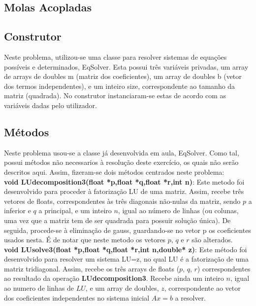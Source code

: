 \documentclass{article}
\begin{document}
\begin{multicols}{2}
  \section{Molas Acopladas}
  \par  

  \subsection{Construtor}
  Neste problema, utilizou-se uma classe para resolver sistemas de equações possíveis e determinados, EqSolver. Esta possui três variáveis privadas, um array de arrays de doubles m (matriz dos coeficientes), um array de doubles b (vetor dos termos independentes), e um inteiro size, correspondente ao tamanho da matriz (quadrada). No construtor instanciaram-se estas de acordo com as variáveis dadas pelo utilizador.

  \subsection{M\'etodos}
  Neste problema usou-se a classe já desenvolvida em aula, EqSolver. Como tal, possui métodos não necessarios à resolução deste exercício, os quais não serão descritos aqui. Assim, fizeram-se dois métodos centrados  neste problema:\\

  \textbf{void LUdecomposition3(float *p,float *q,float *r,int n)}: Este metodo foi desenvolvido para proceder à fatorização LU de uma matriz. Assim, recebe três vetores de floats, correspondentes às três diagonais não-nulas da matriz, sendo $p$ a inferior e $q$ a principal, e um inteiro $n$, igual ao número de linhas (ou colunas, uma vez que a matriz tem de ser quadrada para possuir solução única). De seguida, procede-se à eliminação de gauss, guardando-se no vetor p os coeficientes usados nesta. É de notar que neste metodo os vetores $p$, $q$ e $r$ são alterados.\\

  \textbf{void LUsolve3(float *p,float *q,float *r,int n,double* z)}: Este método foi desenvolvido para resolver um sistema LU=z, no qual LU é a fatorização de uma matriz tridiagonal. Assim, recebe os três arrays de floats ($p$, $q$, $r$) correspondentes ao resultado da operação \textbf{LUdecomposition3}. Recebe ainda um inteiro $n$, igual ao numero de linhas de $LU$, e um array de doubles, $z$, correspondente ao vetor dos coeficientes independentes no sistema inicial $Ax = b$ a resolver.\\


\end{multicols}
\end{document}
